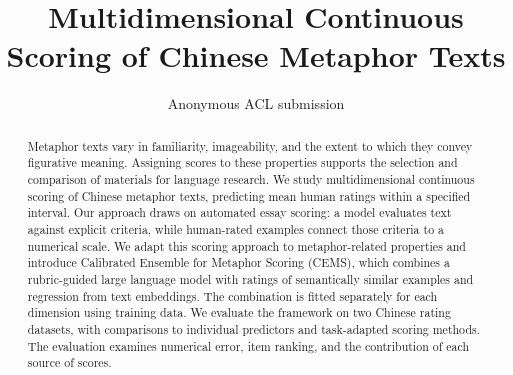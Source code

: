 \documentclass[11pt]{article}
\title{Multidimensional Continuous Scoring of Chinese Metaphor Texts}
\author{Anonymous ACL submission}
\begin{document}
\raggedbottom
\maketitle
\begin{abstract}
Metaphor texts vary in familiarity, imageability, and the extent to which they convey figurative meaning. Assigning scores to these properties supports the selection and comparison of materials for language research. We study multidimensional continuous scoring of Chinese metaphor texts, predicting mean human ratings within a specified interval. Our approach draws on automated essay scoring: a model evaluates text against explicit criteria, while human-rated examples connect those criteria to a numerical scale. We adapt this scoring approach to metaphor-related properties and introduce Calibrated Ensemble for Metaphor Scoring (CEMS), which combines a rubric-guided large language model with ratings of semantically similar examples and regression from text embeddings. The combination is fitted separately for each dimension using training data. We evaluate the framework on two Chinese rating datasets, with comparisons to individual predictors and task-adapted scoring methods. The evaluation examines numerical error, item ranking, and the contribution of each source of scores.
\end{abstract}












\clearpage
\appendix
\makeatletter
\setlength{\@fptop}{0pt}
\setlength{\@fpsep}{16pt}
\setlength{\@dblfptop}{0pt}
\setlength{\@dblfpsep}{16pt}
\makeatother

\end{document}
